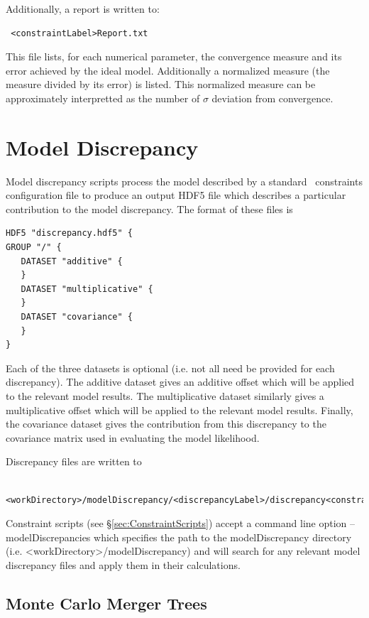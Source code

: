 Additionally, a report is written to:
\begin{verbatim}
 <constraintLabel>Report.txt
\end{verbatim}
This file lists, for each numerical parameter, the convergence measure and its error achieved by the ideal model. Additionally a normalized measure (the measure divided by its error) is listed. This normalized measure can be approximately interpretted as the number of $\sigma$ deviation from convergence.

\section{Model Discrepancy}\label{sec:ModelDiscrepancy}

Model discrepancy scripts process the model described by a standard \glc\ constraints configuration file to produce an output HDF5 file which describes a particular contribution to the model discrepancy. The format of these files is
\begin{verbatim}
HDF5 "discrepancy.hdf5" {
GROUP "/" {
   DATASET "additive" {
   }
   DATASET "multiplicative" {
   }
   DATASET "covariance" {
   }
}
\end{verbatim}
Each of the three datasets is optional (i.e. not all need be provided for each discrepancy). The {\normalfont \ttfamily additive} dataset gives an additive offset which will be applied to the relevant model results. The {\normalfont \ttfamily multiplicative} dataset similarly gives a multiplicative offset which will be applied to the relevant model results. Finally, the {\normalfont \ttfamily covariance} dataset gives the contribution from this discrepancy to the covariance matrix used in evaluating the model likelihood.

Discrepancy files are written to
\begin{verbatim}
 <workDirectory>/modelDiscrepancy/<discrepancyLabel>/discrepancy<constraintLabel>.hdf5
\end{verbatim}

Constraint scripts (see \S\ref{sec:ConstraintScripts}) accept a command line option {\normalfont \ttfamily --modelDiscrepancies} which specifies the path to the {\normalfont \ttfamily modelDiscrepancy} directory (i.e. {\normalfont \ttfamily <workDirectory>/modelDiscrepancy}) and will search for any relevant model discrepancy files and apply them in their calculations.

\subsection{Monte Carlo Merger Trees}

